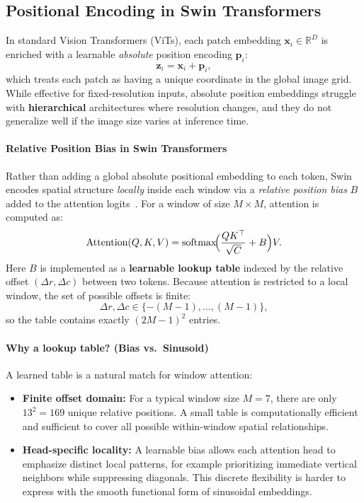 \subsection{Positional Encoding in Swin Transformers}
\label{enrichment:swin_positional_bias}

\noindent
In standard Vision Transformers (ViTs), each patch embedding \(\mathbf{x}_i \in \mathbb{R}^{D}\) is enriched with a learnable \emph{absolute} position encoding \(\mathbf{p}_i\):
\[
\mathbf{z}_i = \mathbf{x}_i + \mathbf{p}_i,
\]
which treats each patch as having a unique coordinate in the global image grid. While effective for fixed-resolution inputs, absolute position embeddings struggle with \textbf{hierarchical} architectures where resolution changes, and they do not generalize well if the image size varies at inference time.

\paragraph{Relative Position Bias in Swin Transformers}
\noindent
Rather than adding a global absolute positional embedding to each token, Swin encodes spatial structure \emph{locally} inside each window via a \emph{relative position bias} \(B\) added to the attention logits~\cite{liu2021_swin}.
For a window of size \(M \times M\), attention is computed as:
\[
\text{Attention}(Q,K,V)
=
\text{softmax}\!\Bigl(\frac{QK^\top}{\sqrt{C}} + B\Bigr)V.
\]
Here \(B\) is implemented as a \textbf{learnable lookup table} indexed by the relative offset \((\Delta r, \Delta c)\) between two tokens.
Because attention is restricted to a local window, the set of possible offsets is finite:
\[
\Delta r, \Delta c \in \{-(M-1), \ldots, (M-1)\},
\]
so the table contains exactly \((2M-1)^2\) entries.

\paragraph{Why a lookup table? (Bias vs.\ Sinusoid)}
\noindent
A learned table is a natural match for window attention:
\begin{itemize}
	\item \textbf{Finite offset domain:} For a typical window size \(M=7\), there are only \(13^2 = 169\) unique relative positions. A small table is computationally efficient and sufficient to cover all possible within-window spatial relationships.
	\item \textbf{Head-specific locality:} A learnable bias allows each attention head to emphasize distinct local patterns, for example prioritizing immediate vertical neighbors while suppressing diagonals. This discrete flexibility is harder to express with the smooth functional form of sinusoidal embeddings.
\end{itemize}

